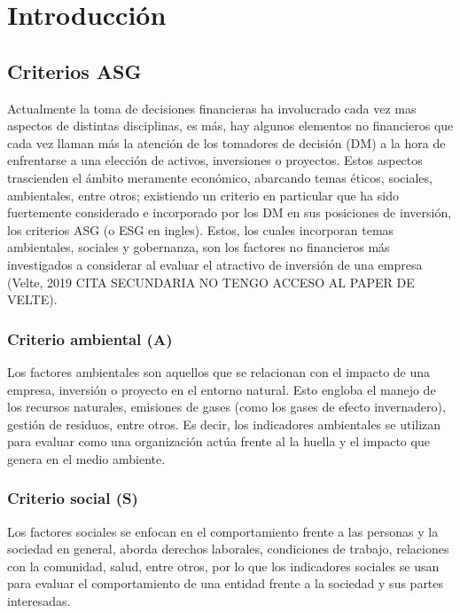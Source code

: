\documentclass[11pt,letterpaper]{article}
\begin{document}

\tableofcontents
\newpage


\section{Introducción}

\subsection{Criterios ASG}

 Actualmente la toma de decisiones financieras ha involucrado cada vez mas aspectos de distintas disciplinas, es más, hay algunos elementos no financieros que cada vez llaman más la atención de los tomadores de decisión (DM) a la hora de enfrentarse a una elección de activos, inversiones o proyectos. Estos aspectos trascienden el ámbito meramente económico, abarcando temas éticos, sociales, ambientales, entre otros; existiendo un criterio en particular que ha sido fuertemente considerado e incorporado por los DM en sus posiciones de inversión, los criterios ASG (o ESG en ingles). Estos, los cuales incorporan temas ambientales, sociales y gobernanza, son los factores no financieros más investigados a considerar al evaluar el atractivo de inversión de una empresa (Velte, 2019 CITA SECUNDARIA NO TENGO ACCESO AL PAPER DE VELTE).

 \subsubsection{Criterio ambiental (A)}
Los factores ambientales son aquellos que se relacionan con el impacto de una empresa, inversión o proyecto en el entorno natural. Esto engloba el manejo de los recursos naturales, emisiones de gases (como los gases de efecto invernadero), gestión de residuos, entre otros. Es decir, los indicadores ambientales se utilizan para evaluar como una organización actúa frente al la huella y el impacto que genera en el medio ambiente.

 \subsubsection{Criterio social (S)}
 Los factores sociales se enfocan en el comportamiento frente a las personas y la sociedad en general, aborda derechos laborales, condiciones de trabajo, relaciones con la comunidad, salud, entre otros, por lo que los indicadores sociales se usan para evaluar el comportamiento de una entidad frente a la sociedad y sus partes interesadas.
\end{document}
